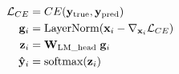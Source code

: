 \documentclass[../thesis.tex]{subfiles}
\begin{document}
\begin{equation}
\begin{split}
    \mathcal{L}_{CE} &= CE(\mathbf{y}_\text{true}, \mathbf{y}_\text{pred}) \\
    \mathbf{g}_i &= \text{LayerNorm}(\mathbf{x}_i - \nabla_{\mathbf{x}_i}\mathcal{L}_{CE}) \\
    \mathbf{z}_i &= \mathbf{W}_\text{LM\_head} \; \mathbf{g}_i \\
    \mathbf{\hat{y}}_i &= \text{softmax}(\mathbf{z}_i)
\end{split}
\label{eq:sum_grads_ilm_classification}
\end{equation}

\subbib{}
\end{document}
